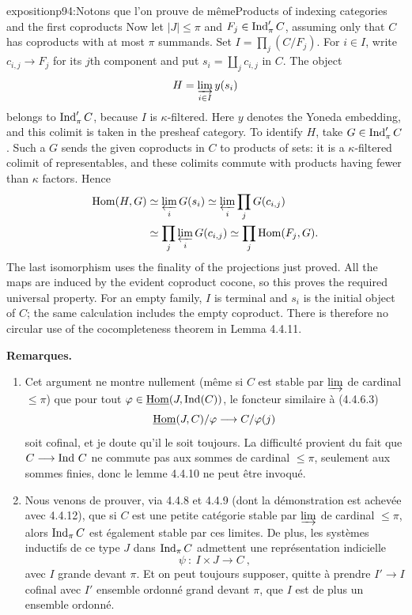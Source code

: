 \begin{dcomment}{exposition}{p94:Notons que l'on prouve de même}{Products of indexing categories and the first coproducts}
Now let $|J|\leq\pi$ and $F_j\in\operatorname{Ind}'_\pi C$, assuming only that $C$ has coproducts with at most $\pi$ summands. Set $I=\prod_j(C/F_j)$. For $i\in I$, write $c_{i,j}\to F_j$ for its $j$th component and put $s_i=\coprod_jc_{i,j}$ in $C$. The object
\[
H=\varinjlim_{i\in I}y(s_i)
\]
belongs to $\operatorname{Ind}'_\pi C$, because $I$ is $\kappa$-filtered. Here $y$ denotes the Yoneda embedding, and this colimit is taken in the presheaf category. To identify $H$, take $G\in\operatorname{Ind}'_\pi C$. Such a $G$ sends the given coproducts in $C$ to products of sets: it is a $\kappa$-filtered colimit of representables, and these colimits commute with products having fewer than $\kappa$ factors. Hence
\[
\begin{aligned}
\mathrm{Hom}(H,G)
&\simeq\varprojlim_iG(s_i)
\simeq\varprojlim_i\prod_jG(c_{i,j})\\
&\simeq\prod_j\varprojlim_iG(c_{i,j})
\simeq\prod_j\mathrm{Hom}(F_j,G).
\end{aligned}
\]
The last isomorphism uses the finality of the projections just proved. All the maps are induced by the evident coproduct cocone, so this proves the required universal property. For an empty family, $I$ is terminal and $s_i$ is the initial object of $C$; the same calculation includes the empty coproduct. There is therefore no circular use of the cocompleteness theorem in Lemma 4.4.11.
\end{dcomment}


\textbf{Remarques.}
\begin{enumerate}[label={}, leftmargin=*]
\item[1.] Cet argument ne montre nullement (même si $C$ est stable par $\varinjlim$ de cardinal $\leqslant \pi$) que pour tout $\varphi \in \underline{\mathrm{Hom}}(J,\operatorname{Ind}(C))$, le foncteur similaire à (4.4.6.3)
\[
\underline{\mathrm{Hom}}(J,C)/\varphi \longrightarrow C/\varphi(j)
\]
soit cofinal, et je doute qu'il le soit toujours. La difficulté provient du fait que $C \longrightarrow \operatorname{Ind}\, C$ ne commute pas aux sommes de cardinal $\leqslant \pi$, seulement aux sommes finies,
donc le lemme 4.4.10 ne peut être invoqué.
\item[2.] Nous venons de prouver, via 4.4.8 et 4.4.9 (dont la démonstration est achevée avec 4.4.12), que si $C$ est une petite catégorie stable par $\varinjlim$ de cardinal $\leqslant \pi$, alors $\operatorname{Ind}_\pi C$ est également stable par ces limites. De plus, les systèmes inductifs de ce type $J$ dans $\operatorname{Ind}_\pi C$ admettent une représentation indicielle
\[
\psi \ :\ I \times J \longrightarrow C\ ,
\]
avec $I$ grande devant $\pi$. Et on peut toujours supposer, quitte à prendre $I' \longrightarrow I$ cofinal avec $I'$ ensemble ordonné grand devant $\pi$, que $I$ est de plus un ensemble ordonné.
\end{enumerate}

